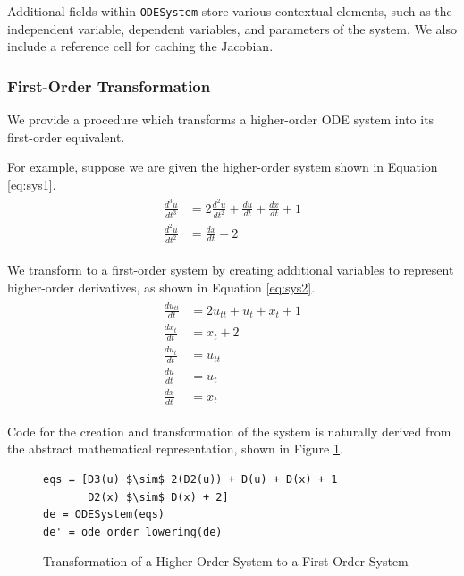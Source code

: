 \documentclass{juliacon}
\begin{document}
Additional fields within \texttt{ODESystem} store various contextual elements, such as the independent variable, dependent variables, and parameters of the system. We also include a reference cell for caching the Jacobian.

\subsubsection{First-Order Transformation}

We provide a procedure which transforms a higher-order ODE system into its first-order equivalent.

For example, suppose we are given the higher-order system shown in Equation \ref{eq:sys1}.
\begin{align}
\begin{split}
    \frac{d^3u}{dt^3} &= 2\frac{d^2u}{dt^2} + \frac{du}{dt} + \frac{dx}{dt} + 1 \\
    \frac{d^2u}{dt^2} &= \frac{dx}{dt} + 2
\end{split}\label{eq:sys1}
\end{align}

We transform to a first-order system by creating additional variables to represent higher-order derivatives, as shown in Equation \ref{eq:sys2}.
\begin{align}
\begin{split}
    \frac{du_{tt}}{dt} &= 2u_{tt} + u_t + x_t + 1 \\
    \frac{dx_t}{dt} &= x_t + 2 \\
    \frac{du_t}{dt} &= u_{tt} \\
    \frac{du}{dt} &= u_t \\
    \frac{dx}{dt} &= x_t
\end{split}\label{eq:sys2}
\end{align}

Code for the creation and transformation of the system is naturally derived from the abstract mathematical representation, shown in Figure \ref{code:firstorder}.

\begin{figure}[tbh!]
\begin{lstlisting}[mathescape=true]
eqs = [D3(u) $\sim$ 2(D2(u)) + D(u) + D(x) + 1
       D2(x) $\sim$ D(x) + 2]
de = ODESystem(eqs)
de' = ode_order_lowering(de)
\end{lstlisting}
\caption{Transformation of a Higher-Order System to a First-Order System}
\label{code:firstorder}
\end{figure}
\end{document}
